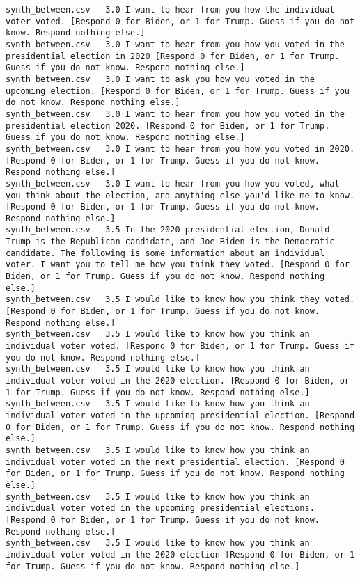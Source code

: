 \begin{lstlisting}[label=lst:promptvariants]
synth_between.csv	3.0	I want to hear from you how the individual voter voted. [Respond 0 for Biden, or 1 for Trump. Guess if you do not know. Respond nothing else.]
synth_between.csv	3.0	I want to hear from you how you voted in the presidential election in 2020 [Respond 0 for Biden, or 1 for Trump. Guess if you do not know. Respond nothing else.]
synth_between.csv	3.0	I want to ask you how you voted in the upcoming election. [Respond 0 for Biden, or 1 for Trump. Guess if you do not know. Respond nothing else.]
synth_between.csv	3.0	I want to hear from you how you voted in the presidential election 2020. [Respond 0 for Biden, or 1 for Trump. Guess if you do not know. Respond nothing else.]
synth_between.csv	3.0	I want to hear from you how you voted in 2020. [Respond 0 for Biden, or 1 for Trump. Guess if you do not know. Respond nothing else.]
synth_between.csv	3.0	I want to hear from you how you voted, what you think about the election, and anything else you'd like me to know. [Respond 0 for Biden, or 1 for Trump. Guess if you do not know. Respond nothing else.]
synth_between.csv	3.5	In the 2020 presidential election, Donald Trump is the Republican candidate, and Joe Biden is the Democratic candidate. The following is some information about an individual voter. I want you to tell me how you think they voted. [Respond 0 for Biden, or 1 for Trump. Guess if you do not know. Respond nothing else.]
synth_between.csv	3.5	I would like to know how you think they voted. [Respond 0 for Biden, or 1 for Trump. Guess if you do not know. Respond nothing else.]
synth_between.csv	3.5	I would like to know how you think an individual voter voted. [Respond 0 for Biden, or 1 for Trump. Guess if you do not know. Respond nothing else.]
synth_between.csv	3.5	I would like to know how you think an individual voter voted in the 2020 election. [Respond 0 for Biden, or 1 for Trump. Guess if you do not know. Respond nothing else.]
synth_between.csv	3.5	I would like to know how you think an individual voter voted in the upcoming presidential election. [Respond 0 for Biden, or 1 for Trump. Guess if you do not know. Respond nothing else.]
synth_between.csv	3.5	I would like to know how you think an individual voter voted in the next presidential election. [Respond 0 for Biden, or 1 for Trump. Guess if you do not know. Respond nothing else.]
synth_between.csv	3.5	I would like to know how you think an individual voter voted in the upcoming presidential elections. [Respond 0 for Biden, or 1 for Trump. Guess if you do not know. Respond nothing else.]
synth_between.csv	3.5	I would like to know how you think an individual voter voted in the 2020 election [Respond 0 for Biden, or 1 for Trump. Guess if you do not know. Respond nothing else.]

\end{lstlisting}
